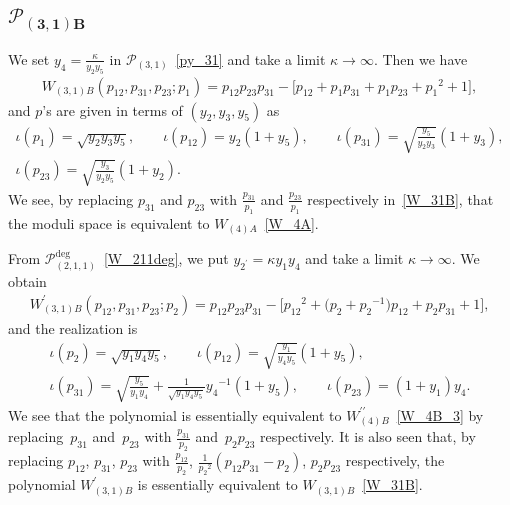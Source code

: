 \documentclass[10pt,a4paper]{amsart}
\numberwithin{equation}{section}
\begin{document}
\subsection[$\mathcal{P}_{(3,1)B}$]{$\boldsymbol{\mathcal{P}_{(3,1)B}}$}
We set $y_4=\frac{\kappa}{y_2 y_5}$ in $\mathcal{P}_{(3,1)}$~\eqref{py_31} and take a limit $\kappa\to\infty$. Then we have
\begin{gather} \label{W_31B}
 W_{(3,1)B}(p_{12}, p_{31}, p_{23} ; p_1 ) = p_{12} p_{23} p_{31} - \big[ p_{12} + p_1 p_{31} + p_1 p_{23} + {p_1}^2+ 1 \big],
\end{gather}
and $p$'s are given in terms of $(y_2, y_3, y_5)$ as
\begin{gather*}
 \iota(p_1) = \sqrt{y_2 y_3 y_5} , \qquad \iota(p_{12}) = y_2 ( 1 + y_5) ,\qquad \iota(p_{31}) = \sqrt{\frac{y_5}{y_2 y_3}} ( 1 + y_3) , \\
\iota(p_{23}) = \sqrt{\frac{y_3}{y_2 y_5}} ( 1 + y_2) .
\end{gather*}
We see, by replacing $p_{31}$ and $p_{23}$ with $\frac{p_{31}}{p_1}$ and $\frac{p_{23}}{p_1}$ respectively in~\eqref{W_31B}, that the moduli space is equivalent to $W_{(4)A}$~\eqref{W_4A}.

From $\mathcal{P}_{(2,1,1)}^{\text{deg}}$~\eqref{W_211deg}, we put $y_{2^\prime} = \kappa y_1 y_4$ and take a limit $\kappa\to\infty$. We obtain
\begin{gather*}%
 W^\prime_{(3,1)B}(p_{12}, p_{31}, p_{23}; p_2) = p_{12} p_{23} p_{31} - \big[ {p_{12}}^2 + \big(p_2 + {p_2}^{-1} \big) p_{12} + p_2 p_{31} + 1 \big],
\end{gather*}
and the realization is
\begin{gather*}
 \iota(p_2) = \sqrt{ y_1 y_4 y_5},\qquad \iota(p_{12}) = \sqrt{\frac{y_1}{y_4 y_5}} ( 1+y_5) , \\
\iota(p_{31}) = \sqrt{\frac{y_5}{y_1 y_4}} + \frac{1}{\sqrt{y_1 y_4 y_5}} {y_4}^{-1} ( 1 + y_5 ) , \qquad \iota(p_{23}) = ( 1 + y_1 ) y_4 .
\end{gather*}
We see that the polynomial is essentially equivalent to $W^{\prime\prime}_{(4)B}$~\eqref{W_4B_3} by replacing~$p_{31}$ and~$p_{23}$ with $\frac{p_{31}}{p_2}$ and~$p_2 p_{23}$ respectively. It is also seen that, by replacing $p_{12}$, $p_{31}$, $p_{23}$ with $\frac{p_{12}}{p_2}$, $\frac{1}{{p_2}^2} ( p_{12} p_{31} - p_2)$, $p_2 p_{23}$ respectively, the polynomial $W^\prime_{(3,1)B}$ is essentially equivalent to $W_{(3,1)B}$~\eqref{W_31B}.
\end{document}
